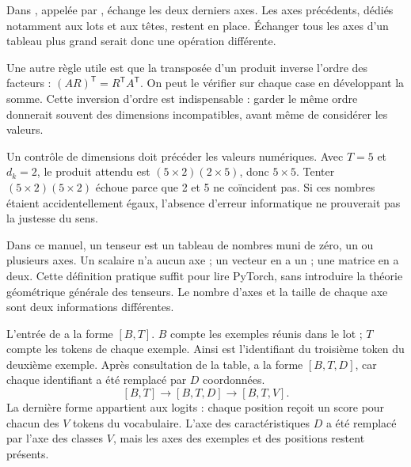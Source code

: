 Dans , appelée
par ,
 échange les deux derniers axes.
Les axes précédents, dédiés notamment aux lots et aux têtes,
restent en place. Échanger tous les axes d'un tableau plus grand
serait donc une opération différente.

Une autre règle utile est que la transposée d'un produit inverse
l'ordre des facteurs : \((AR)^{\mathsf T}=R^{\mathsf T}A^{\mathsf T}\).
On peut le vérifier sur chaque case en développant la somme.
Cette inversion d'ordre est indispensable : garder le même ordre
donnerait souvent des dimensions incompatibles, avant même de
considérer les valeurs.

Un contrôle de dimensions doit précéder les valeurs numériques.
Avec \(T=5\) et \(d_k=2\), le produit attendu est
\((5\times2)(2\times5)\), donc \(5\times5\).
Tenter \((5\times2)(5\times2)\) échoue parce que 2 et 5
ne coïncident pas. Si ces nombres étaient accidentellement égaux,
l'absence d'erreur informatique ne prouverait pas la justesse du sens.



Dans ce manuel, un tenseur est un tableau de nombres muni de zéro,
un ou plusieurs axes. Un scalaire n'a aucun axe ; un vecteur en a
un ; une matrice en a deux. Cette définition pratique suffit pour
lire PyTorch, sans introduire la théorie géométrique générale des
tenseurs. Le nombre d'axes et la taille de chaque axe sont deux
informations différentes.

L'entrée  de  a la forme \([B,T]\).
\(B\) compte les exemples réunis dans le lot ; \(T\) compte les
tokens de chaque exemple. Ainsi  est l'identifiant du
troisième token du deuxième exemple. Après consultation de la table,
 a la forme \([B,T,D]\), car chaque identifiant
a été remplacé par \(D\) coordonnées.
\[
 [B,T]\longrightarrow[B,T,D]\longrightarrow[B,T,V].
\]
La dernière forme appartient aux logits : chaque position reçoit
un score pour chacun des \(V\) tokens du vocabulaire.
L'axe des caractéristiques \(D\) a été remplacé par l'axe des
classes \(V\), mais les axes des exemples et des positions restent
présents.

